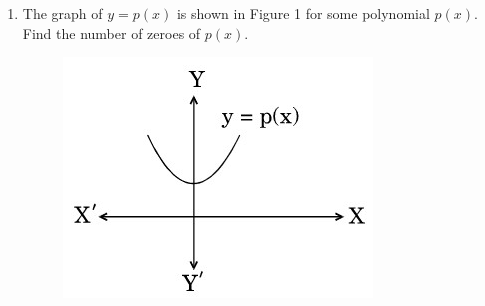 
%
\begin{enumerate}

\item The graph of $y = p(x)$ is shown in Figure 1 for some polynomial $p(x)$. Find the number of zeroes of $p(x)$.

\begin{figure}[h]
\centering
\includegraphics[width=\columnwidth]{figs/ques8.jpg}
\caption{}
\label{fig:my_label}
\end{figure}

\end{enumerate}
%
